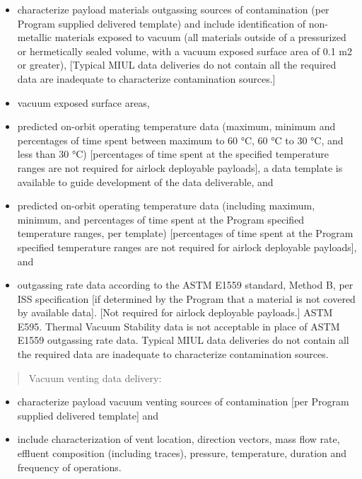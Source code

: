 \begin{itemize}
\item{} characterize payload materials outgassing sources of contamination (per Program supplied delivered template) and include identification of non-metallic materials exposed to vacuum (all materials outside of a pressurized or hermetically sealed volume, with a vacuum exposed surface area of 0.1 m2 or greater), [Typical
MIUL data deliveries do not contain all the required data are inadequate to characterize contamination sources.]

\item{} vacuum exposed surface areas,

\item{} predicted on-orbit operating temperature data (maximum, minimum and percentages of time spent between maximum to 60 °C, 60 °C to 30 °C, and less than 30 °C) [percentages of time spent at the specified temperature ranges are not required for airlock deployable payloads], a data template is available to guide
development of the data deliverable, and

\item{} predicted on-orbit operating temperature data (including maximum, minimum, and percentages of time spent at the Program specified temperature ranges, per template) [percentages of time spent at the Program specified temperature ranges are not required for airlock deployable payloads], and

\item{} outgassing rate data according to the ASTM E1559 standard, Method B, per ISS specification [if determined by the Program that a material is not covered by available data]. [Not required for airlock deployable payloads.] ASTM E595. Thermal Vacuum Stability data is not acceptable in place of ASTM E1559 outgassing rate data. Typical MIUL data deliveries do not contain all the required data are inadequate to characterize contamination sources.

\end{itemize}

\begin{quote}
Vacuum venting data delivery:
\end{quote}

\begin{itemize}
\item{} characterize payload vacuum venting sources of contamination [per Program supplied delivered template] and

\item{} include characterization of vent location, direction vectors, mass flow rate, effluent composition (including traces), pressure, temperature, duration and frequency of operations.

\end{itemize}

